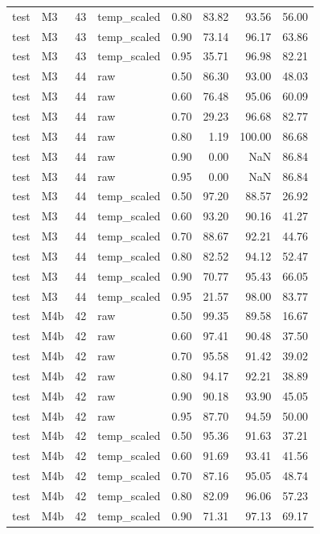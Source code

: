 \begin{tabular}{llrlrrrr}
test & M3 & 43 & temp\_scaled & 0.80 & 83.82 & 93.56 & 56.00 \\
test & M3 & 43 & temp\_scaled & 0.90 & 73.14 & 96.17 & 63.86 \\
test & M3 & 43 & temp\_scaled & 0.95 & 35.71 & 96.98 & 82.21 \\
test & M3 & 44 & raw & 0.50 & 86.30 & 93.00 & 48.03 \\
test & M3 & 44 & raw & 0.60 & 76.48 & 95.06 & 60.09 \\
test & M3 & 44 & raw & 0.70 & 29.23 & 96.68 & 82.77 \\
test & M3 & 44 & raw & 0.80 & 1.19 & 100.00 & 86.68 \\
test & M3 & 44 & raw & 0.90 & 0.00 & NaN & 86.84 \\
test & M3 & 44 & raw & 0.95 & 0.00 & NaN & 86.84 \\
test & M3 & 44 & temp\_scaled & 0.50 & 97.20 & 88.57 & 26.92 \\
test & M3 & 44 & temp\_scaled & 0.60 & 93.20 & 90.16 & 41.27 \\
test & M3 & 44 & temp\_scaled & 0.70 & 88.67 & 92.21 & 44.76 \\
test & M3 & 44 & temp\_scaled & 0.80 & 82.52 & 94.12 & 52.47 \\
test & M3 & 44 & temp\_scaled & 0.90 & 70.77 & 95.43 & 66.05 \\
test & M3 & 44 & temp\_scaled & 0.95 & 21.57 & 98.00 & 83.77 \\
test & M4b & 42 & raw & 0.50 & 99.35 & 89.58 & 16.67 \\
test & M4b & 42 & raw & 0.60 & 97.41 & 90.48 & 37.50 \\
test & M4b & 42 & raw & 0.70 & 95.58 & 91.42 & 39.02 \\
test & M4b & 42 & raw & 0.80 & 94.17 & 92.21 & 38.89 \\
test & M4b & 42 & raw & 0.90 & 90.18 & 93.90 & 45.05 \\
test & M4b & 42 & raw & 0.95 & 87.70 & 94.59 & 50.00 \\
test & M4b & 42 & temp\_scaled & 0.50 & 95.36 & 91.63 & 37.21 \\
test & M4b & 42 & temp\_scaled & 0.60 & 91.69 & 93.41 & 41.56 \\
test & M4b & 42 & temp\_scaled & 0.70 & 87.16 & 95.05 & 48.74 \\
test & M4b & 42 & temp\_scaled & 0.80 & 82.09 & 96.06 & 57.23 \\
test & M4b & 42 & temp\_scaled & 0.90 & 71.31 & 97.13 & 69.17 \\

\end{tabular}
